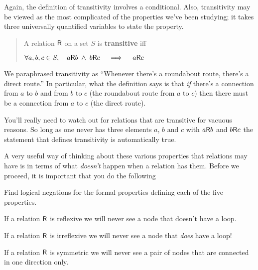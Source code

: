 Again, the definition of transitivity involves a conditional.  Also, transitivity may be viewed 
as the most complicated of the properties we've been studying; it takes three universally 
quantified variables to state the property.

\begin{quote}
A relation $\mbox{\textsf R}$ on a set $S$ is {\bf transitive} iff \newline
\centerline{ $\displaystyle \forall a,b,c \in S, \quad a \mbox{\textsf R} b \; \land \; b \mbox{\textsf R} c \quad \implies \quad a \mbox{\textsf R} c$ }
\end{quote}

We paraphrased transitivity as  ``Whenever there's a roundabout route, there's a direct route.''
In particular, what the definition says is that \emph{if} there's a connection from $a$ to $b$ and from
$b$ to $c$ (the roundabout route from $a$ to $c$) then there must be a connection from $a$ to $c$ (the direct
route).  

You'll really need to watch out for relations that are transitive for vacuous reasons.  So long as one
never has three elements $a$, $b$ and $c$ with $a \mbox{\textsf R} b$ and $b \mbox{\textsf R} c$ the statement that defines
transitivity is automatically true.

A very useful way of thinking about these various properties that relations may have is in terms of 
what \emph{doesn't} happen when a relation has them.  Before we proceed, it is important that 
you do the following

\begin{exer}
Find logical negations for the formal properties defining each of the five
properties.
\end{exer}

\newpage

If a relation $\mbox{\textsf R}$ is reflexive we will never see a node that doesn't have a loop.

\begin{center}

\end{center}

\vfill

If a relation $\mbox{\textsf R}$ is irreflexive we will never see a node that \emph{does} have a loop!

\begin{center}

\end{center}

\vfill

If a relation $\mbox{\textsf R}$ is symmetric we will never see a pair of nodes that are connected in one
direction only.

